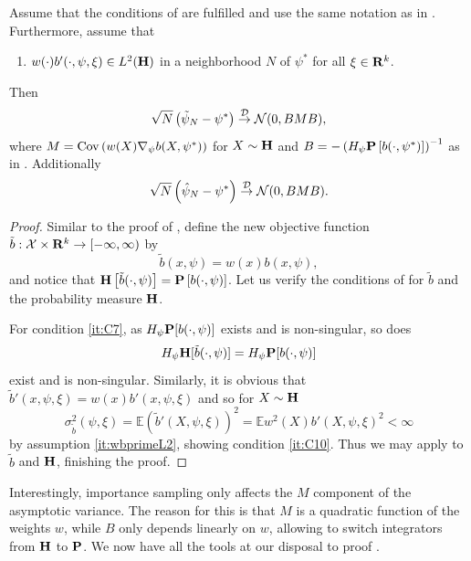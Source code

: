 \begin{proposition}
    \label{prop:is-clt}
    Assume that the conditions of  are fulfilled and use the same notation as in . Furthermore, assume that 
    \begin{enumerate}
        \item[(A)] \label{it:wbprimeL2} $w(\cdot) b'(\cdot, \psi, \xi) \in L^{2}(\H)$ in a neighborhood $N$ of $\psi^{\ast}$ for all $\xi \in \R^{k}$.
    \end{enumerate}

    Then 
    \begin{equation}
        \sqrt{N} \left( \tilde \psi_{N} - \psi^\ast \right) \convD \Normal (0, B M B),
    \end{equation}
    where $M = \cov \left( w(X)\nabla_{\psi} b(X,\psi^{\ast}) \right)$ for $X\sim\H$ and $B= - \left(H_{\psi} \P \left[ b(\cdot, \psi^{\ast}) \right]\right)^{-1}$ as in . Additionally
    \begin{equation}
        \sqrt{N}\left( \hat\psi_{N} - \psi^{\ast} \right) \convD \Normal (0, B M B).
    \end{equation}
\end{proposition}

\begin{proof}
    Similar to the proof of , define the new objective function $\tilde b: \mathcal X \times \R^{k} \to [-\infty, \infty)$ by
    $$
    \tilde b(x,\psi) = w(x) b(x, \psi),
    $$
    and notice that $\H \left[ \tilde b(\cdot, \psi) \right] = \P \left[ b(\cdot, \psi) \right]$. Let us verify the conditions of  for $\tilde b$ and the probability measure $\H$. 

    For condition \ref{it:C7}, as $H_{\psi} \P [b(\cdot, \psi)]$ exists and is non-singular, so does $$H_{\psi} \H [\tilde b(\cdot, \psi)] = H_{\psi} \P [b(\cdot, \psi)]$$
    exist and is non-singular. Similarly, it is obvious that $\tilde b'(x,\psi,\xi) = w(x) b'(x, \psi, \xi)$ and so for $X\sim\H$ 
    $$
        \sigma_{\tilde b}^{2}(\psi, \xi) = \mathbb E \left(\tilde b'(X, \psi, \xi)\right)^{2} = \mathbb E w^{2}(X) b'(X, \psi, \xi)^{2} < \infty
    $$
    by assumption \ref{it:wbprimeL2}, showing condition \ref{it:C10}. Thus we may apply  to $\tilde b$ and $\H$, finishing the proof.
\end{proof}

Interestingly, importance sampling only affects the $M$ component of the asymptotic variance. The reason for this is that $M$ is a quadratic function of the weights $w$, while $B$ only depends linearly on $w$, allowing to switch integrators from $\H$ to $\P$.
We now have all the tools at our disposal to proof .

